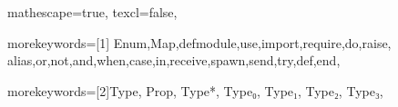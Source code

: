 
 {

mathescape=true,
texcl=false,

morekeywords=[1]{
Enum,Map,defmodule,use,import,require,do,raise,
alias,or,not,and,when,case,in,receive,spawn,send,try,def,end},

morekeywords=[2]{Type, Prop, Type*, Type₀, Type₁, Type₂, Type₃},



}
